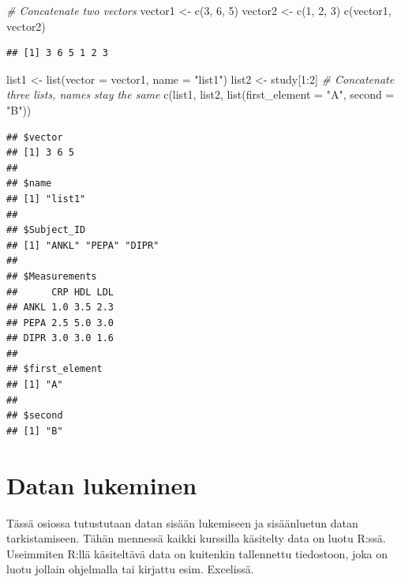 \documentclass[
]{book}
\newenvironment{Shaded}{\begin{snugshade}}{\end{snugshade}}
\newcommand{\AttributeTok}[1]{\textcolor[rgb]{0.77,0.63,0.00}{#1}}
\newcommand{\CommentTok}[1]{\textcolor[rgb]{0.56,0.35,0.01}{\textit{#1}}}
\newcommand{\DecValTok}[1]{\textcolor[rgb]{0.00,0.00,0.81}{#1}}
\newcommand{\FunctionTok}[1]{\textcolor[rgb]{0.00,0.00,0.00}{#1}}
\newcommand{\NormalTok}[1]{#1}
\newcommand{\OtherTok}[1]{\textcolor[rgb]{0.56,0.35,0.01}{#1}}
\newcommand{\SpecialCharTok}[1]{\textcolor[rgb]{0.00,0.00,0.00}{#1}}
\newcommand{\StringTok}[1]{\textcolor[rgb]{0.31,0.60,0.02}{#1}}
\begin{document}
\begin{Shaded}
\begin{Highlighting}[]
\CommentTok{\# Concatenate two vectors}
\NormalTok{vector1 }\OtherTok{\textless{}{-}} \FunctionTok{c}\NormalTok{(}\DecValTok{3}\NormalTok{, }\DecValTok{6}\NormalTok{, }\DecValTok{5}\NormalTok{)}
\NormalTok{vector2 }\OtherTok{\textless{}{-}} \FunctionTok{c}\NormalTok{(}\DecValTok{1}\NormalTok{, }\DecValTok{2}\NormalTok{, }\DecValTok{3}\NormalTok{)}
\FunctionTok{c}\NormalTok{(vector1, vector2)}
\end{Highlighting}
\end{Shaded}

\begin{verbatim}
## [1] 3 6 5 1 2 3
\end{verbatim}

\begin{Shaded}
\begin{Highlighting}[]
\NormalTok{list1 }\OtherTok{\textless{}{-}} \FunctionTok{list}\NormalTok{(}\AttributeTok{vector =}\NormalTok{ vector1,}
              \AttributeTok{name =} \StringTok{"list1"}\NormalTok{)}
\NormalTok{list2 }\OtherTok{\textless{}{-}}\NormalTok{ study[}\DecValTok{1}\SpecialCharTok{:}\DecValTok{2}\NormalTok{]}
\CommentTok{\# Concatenate three lists, names stay the same}
\FunctionTok{c}\NormalTok{(list1, list2, }\FunctionTok{list}\NormalTok{(}\AttributeTok{first\_element =} \StringTok{"A"}\NormalTok{, }\AttributeTok{second =} \StringTok{"B"}\NormalTok{))}
\end{Highlighting}
\end{Shaded}

\begin{verbatim}
## $vector
## [1] 3 6 5
## 
## $name
## [1] "list1"
## 
## $Subject_ID
## [1] "ANKL" "PEPA" "DIPR"
## 
## $Measurements
##      CRP HDL LDL
## ANKL 1.0 3.5 2.3
## PEPA 2.5 5.0 3.0
## DIPR 3.0 3.0 1.6
## 
## $first_element
## [1] "A"
## 
## $second
## [1] "B"
\end{verbatim}

\hypertarget{reading_data}{%
\chapter{Datan lukeminen}\label{reading_data}}

Tässä osiossa tutustutaan datan sisään lukemiseen ja sisäänluetun datan tarkistamiseen. Tähän mennessä kaikki kurssilla käsitelty data on luotu R:ssä. Useimmiten R:llä käsiteltävä data on kuitenkin tallennettu tiedostoon, joka on luotu jollain ohjelmalla tai kirjattu esim. Excelissä.
\end{document}
